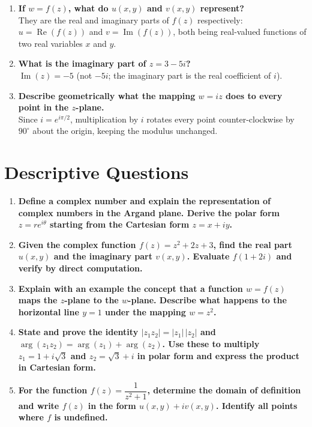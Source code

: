 \documentclass[12pt,a4paper]{article}
\begin{document}
\begin{enumerate}
  \item \textbf{If \(w = f(z)\), what do \(u(x,y)\) and \(v(x,y)\)
        represent?}\\
        They are the real and imaginary parts of \(f(z)\) respectively:
        \(u = \operatorname{Re}(f(z))\) and \(v = \operatorname{Im}(f(z))\),
        both being real-valued functions of two real variables \(x\) and \(y\).

  \item \textbf{What is the imaginary part of \(z = 3 - 5i\)?}\\
        \(\operatorname{Im}(z) = -5\) (not \(-5i\); the imaginary part is the
        real coefficient of \(i\)).

  \item \textbf{Describe geometrically what the mapping \(w = iz\) does to
        every point in the \(z\)-plane.}\\
        Since \(i = e^{i\pi/2}\), multiplication by \(i\) rotates every point
        counter-clockwise by \(90^{\circ}\) about the origin, keeping the
        modulus unchanged.
\end{enumerate}

\section{Descriptive Questions}

\begin{enumerate}
  \item \textbf{Define a complex number and explain the representation of
        complex numbers in the Argand plane.  Derive the polar form
        \(z = re^{i\theta}\) starting from the Cartesian form \(z = x+iy\).}

  \item \textbf{Given the complex function \(f(z) = z^2 + 2z + 3\), find the
        real part \(u(x,y)\) and the imaginary part \(v(x,y)\).  Evaluate
        \(f(1+2i)\) and verify by direct computation.}

  \item \textbf{Explain with an example the concept that a function
        \(w = f(z)\) maps the \(z\)-plane to the \(w\)-plane.  Describe what
        happens to the horizontal line \(y = 1\) under the mapping
        \(w = z^2\).}

  \item \textbf{State and prove the identity
        \(|z_1 z_2| = |z_1|\,|z_2|\) and
        \(\arg(z_1 z_2) = \arg(z_1) + \arg(z_2)\).  Use these to multiply
        \(z_1 = 1+i\sqrt{3}\) and \(z_2 = \sqrt{3}+i\) in polar form and
        express the product in Cartesian form.}

  \item \textbf{For the function \(f(z) = \dfrac{1}{z^2+1}\), determine the
        domain of definition and write \(f(z)\) in the form \(u(x,y)+iv(x,y)\).
        Identify all points where \(f\) is undefined.}
\end{enumerate}
\end{document}
